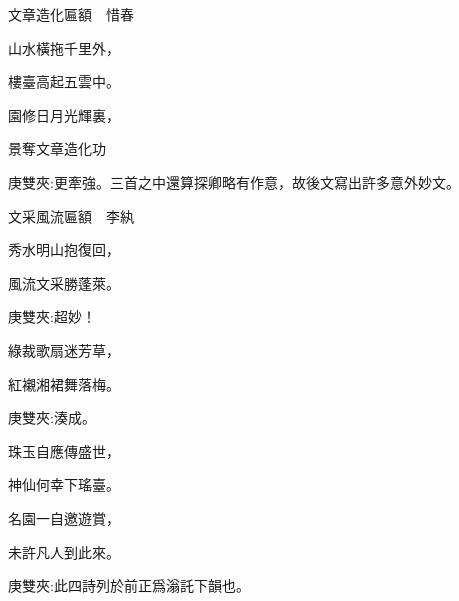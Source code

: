 \begin{poem}
    \begin{pl}文章造化匾額　惜春\end{pl}

    \begin{pl}山水橫拖千里外，\end{pl}

    \begin{pl}樓臺高起五雲中。\end{pl}

    \begin{pl}園修日月光輝裏，\end{pl}

    \begin{pl}景奪文章造化功\end{pl}
    \begin{note}庚雙夾:更牽強。三首之中還算探卿略有作意，故後文寫出許多意外妙文。\end{note}
\end{poem}


\begin{poem}
    \begin{pl}文采風流匾額　李紈\end{pl}

    \begin{pl}秀水明山抱復回，\end{pl}

    \begin{pl}風流文采勝蓬萊。\end{pl}
    \begin{note}庚雙夾:超妙！\end{note}

    \begin{pl}綠裁歌扇迷芳草，\end{pl}

    \begin{pl}紅襯湘裙舞落梅。\end{pl}
    \begin{note}庚雙夾:湊成。\end{note}

    \begin{pl}珠玉自應傳盛世，\end{pl}

    \begin{pl}神仙何幸下瑤臺。\end{pl}

    \begin{pl}名園一自邀遊賞，\end{pl}

    \begin{pl}未許凡人到此來。\end{pl}
    \begin{note}庚雙夾:此四詩列於前正爲滃託下韻也。\end{note}

\end{poem}


